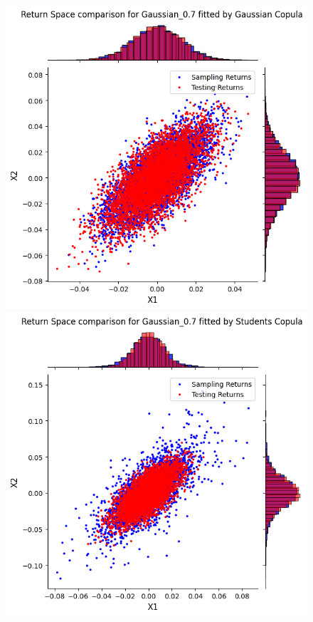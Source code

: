 \documentclass[%
a4paper,							
11pt,								
bibliography=totoc,						
abstracton=true					
]
{scrartcl}
\theoremstyle{plain}
\theoremstyle{definition}
\theoremstyle{remark}
\newcommand{\1}{\mathbbm{1}}
\begin{document}
\begin{figure}[H]
    \centering
    \begin{minipage}{0.49\textwidth}
        \centering
        \includegraphics[width=\textwidth]{5ResultsDiscussion/pictures/PortfolioTest/Port2Gauss.png}
    \end{minipage}
    \hfill
    \begin{minipage}{0.49\textwidth}
        \centering
        \includegraphics[width=\textwidth]{5ResultsDiscussion/pictures/PortfolioTest/Port2Students.png}

\end{minipage}
\end{figure}
\end{document}
